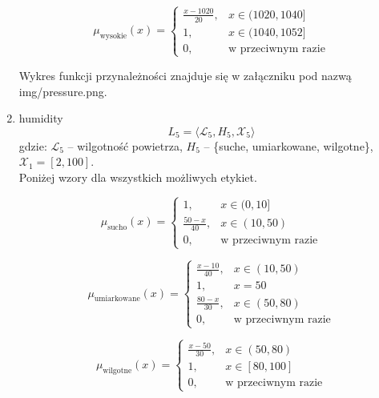 \documentclass{article}
\begin{document}
\begin{enumerate}
                \begin{equation}
                \mu_{\text{wysokie}}(x) =
                    \begin{cases}
                    \frac{x - 1020}{20}, & x \in (1020, 1040] \\
                    1, & x \in (1040, 1052] \\
                    0, & \text{w przeciwnym razie}
                    \end{cases}
                \end{equation}

Wykres funkcji przynależności znajduje się w załączniku pod nazwą img/pressure.png.
    
    \item humidity
    \begin{equation}
            L_5 = \langle \mathcal{L}_5, H_5, \mathcal{X}_5 \rangle
        \end{equation}
        gdzie: $\mathcal{L}_5$ – wilgotność powietrza, $H_5$ – \{suche, umiarkowane, wilgotne\}, $\mathcal{X}_1 = [2, 100]$. \\
        Poniżej wzory dla wszystkich możliwych etykiet.

        \begin{equation}
        \mu_{\text{sucho}}(x) =
        \begin{cases}
        1, & x \in (0, 10] \\
        \frac{50 - x}{40}, & x \in (10, 50) \\
        0, & \text{w przeciwnym razie}
        \end{cases}
        \end{equation}

        \begin{equation}
        \mu_{\text{umiarkowane}}(x) =
        \begin{cases}
        \frac{x - 10}{40}, & x \in (10, 50) \\
        1, & x = 50 \\
        \frac{80 - x}{30}, & x \in (50, 80) \\
        0, & \text{w przeciwnym razie}
        \end{cases}
        \end{equation}

        \begin{equation}
        \mu_{\text{wilgotne}}(x) =
        \begin{cases}
        \frac{x - 50}{30}, & x \in (50, 80) \\
        1, & x \in [80, 100] \\
        0, & \text{w przeciwnym razie}
        \end{cases}
        \end{equation}


\end{enumerate}
\end{document}
